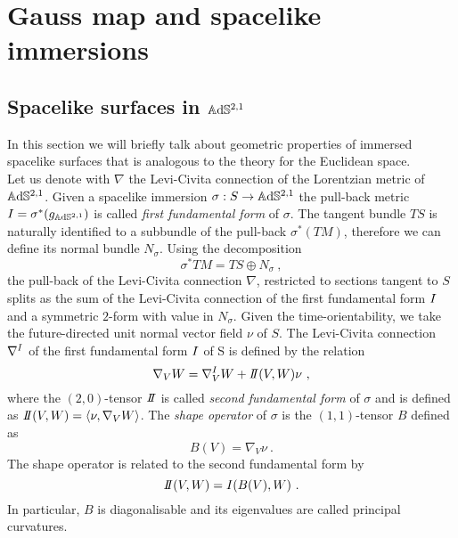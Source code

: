 \chapter{Gauss map and spacelike immersions}

\section{Spacelike surfaces in $\mathbb{A}\mathrm{d}\mathbb{S}^{2,1}$}
In this section we will briefly talk about geometric properties of immersed spacelike surfaces that is analogous to the theory for the Euclidean space.\\
Let us denote with $\nabla$ the Levi-Civita connection of the Lorentzian metric of $\mathbb{A}\mathrm{d}\mathbb{S}^{2,1}$. Given a spacelike immersion $\sigma: S\to\mathbb{A}\mathrm{d}\mathbb{S}^{2,1}$ the pull-back metric $I = \sigma^*(g_{\mathbb{A}\mathrm{d}\mathbb{S}^{2,1}})$ is called \textit{first fundamental form} of $\sigma$.
The tangent bundle $TS$ is naturally identified to a subbundle of the pull-back $\sigma^*(TM)$, therefore we can define its normal bundle $N_\sigma$. Using the decomposition
\[
    \sigma^* TM = TS \oplus N_\sigma \ ,
\]
the pull-back of the Levi-Civita connection $\nabla$, restricted to sections tangent to $S$ splits as the sum of the Levi-Civita connection of the first fundamental form $I$ and a symmetric $2$-form with value in $N_\sigma$. Given the time-orientability, we take the future-directed unit normal vector field $\nu$ of $S$. The Levi-Civita connection $\nabla^I$ of the first fundamental form $I$ of S is defined by the relation
\begin{equation} \label{eq:levi}
    \nabla_V W= \nabla^\I_V W + \II(V,W)\nu \ ,
\end{equation} 
where the $(2,0)$-tensor $\II$ is called \textit{second fundamental form} of $\sigma$ and is defined as $\II(V,W)=\langle \nu, \nabla_V W \rangle$. The \textit{shape  operator} of $\sigma$ is the $(1,1)$-tensor $B$ defined as
\[
    B(V) = \nabla_V \nu \ .
\]
The shape operator is related to the second fundamental form by
\[
    \II(V,W) = \I(B(V),W) \ .
\]
In particular, $B$ is diagonalisable and its eigenvalues are called principal curvatures.\\


